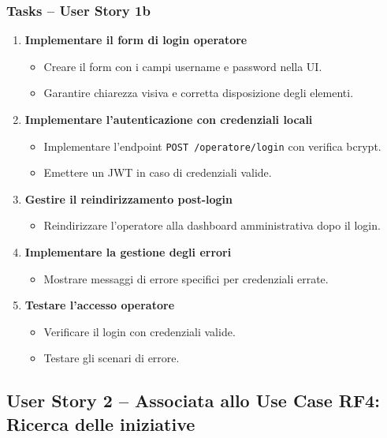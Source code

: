 \documentclass{article}
\begin{document}
\subsubsection{Tasks -- User Story 1b}
\begin{enumerate}
    \item \textbf{Implementare il form di login operatore}
    \begin{itemize}
        \item Creare il form con i campi username e password nella UI.
        \item Garantire chiarezza visiva e corretta disposizione degli elementi.
    \end{itemize}

    \item \textbf{Implementare l'autenticazione con credenziali locali}
    \begin{itemize}
        \item Implementare l'endpoint \texttt{POST /operatore/login} con verifica bcrypt.
        \item Emettere un JWT in caso di credenziali valide.
    \end{itemize}

    \item \textbf{Gestire il reindirizzamento post-login}
    \begin{itemize}
        \item Reindirizzare l'operatore alla dashboard amministrativa dopo il login.
    \end{itemize}

    \item \textbf{Implementare la gestione degli errori}
    \begin{itemize}
        \item Mostrare messaggi di errore specifici per credenziali errate.
    \end{itemize}

    \item \textbf{Testare l'accesso operatore}
    \begin{itemize}
        \item Verificare il login con credenziali valide.
        \item Testare gli scenari di errore.
    \end{itemize}
\end{enumerate}


\subsection{User Story 2 -- Associata allo Use Case RF4: Ricerca delle iniziative}
\end{document}
